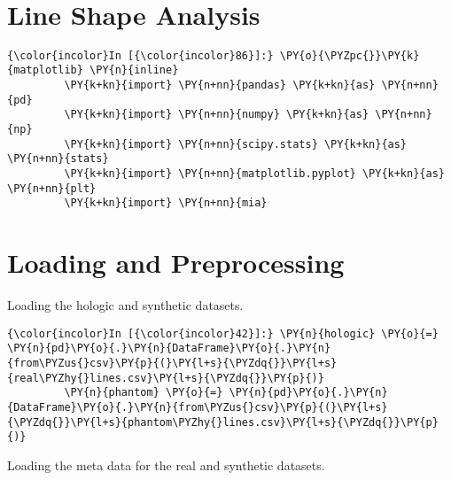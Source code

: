     \begin{center}
    \end{center}
    { \hspace*{\fill} \\}


\section*{Line Shape Analysis}





    \begin{Verbatim}[commandchars=\\\{\}]
{\color{incolor}In [{\color{incolor}86}]:} \PY{o}{\PYZpc{}}\PY{k}{matplotlib} \PY{n}{inline}
         \PY{k+kn}{import} \PY{n+nn}{pandas} \PY{k+kn}{as} \PY{n+nn}{pd}
         \PY{k+kn}{import} \PY{n+nn}{numpy} \PY{k+kn}{as} \PY{n+nn}{np}
         \PY{k+kn}{import} \PY{n+nn}{scipy.stats} \PY{k+kn}{as} \PY{n+nn}{stats}
         \PY{k+kn}{import} \PY{n+nn}{matplotlib.pyplot} \PY{k+kn}{as} \PY{n+nn}{plt}
         \PY{k+kn}{import} \PY{n+nn}{mia}
\end{Verbatim}

    \section{Loading and Preprocessing}\label{loading-and-preprocessing}

    Loading the hologic and synthetic datasets.

    \begin{Verbatim}[commandchars=\\\{\}]
{\color{incolor}In [{\color{incolor}42}]:} \PY{n}{hologic} \PY{o}{=} \PY{n}{pd}\PY{o}{.}\PY{n}{DataFrame}\PY{o}{.}\PY{n}{from\PYZus{}csv}\PY{p}{(}\PY{l+s}{\PYZdq{}}\PY{l+s}{real\PYZhy{}lines.csv}\PY{l+s}{\PYZdq{}}\PY{p}{)}
         \PY{n}{phantom} \PY{o}{=} \PY{n}{pd}\PY{o}{.}\PY{n}{DataFrame}\PY{o}{.}\PY{n}{from\PYZus{}csv}\PY{p}{(}\PY{l+s}{\PYZdq{}}\PY{l+s}{phantom\PYZhy{}lines.csv}\PY{l+s}{\PYZdq{}}\PY{p}{)}
\end{Verbatim}

    Loading the meta data for the real and synthetic datasets.


